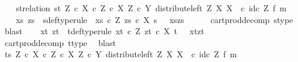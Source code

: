 \begin{isabellebody}
\ \ \isamarkupfalse%
\ st{\isacharunderscore}{\kern0pt}relation{\isacharcolon}{\kern0pt}\ {\isachardoublequoteopen}{\isasymlangle}s{\isacharcomma}{\kern0pt}t{\isasymrangle}\ {\isasymin}\isactrlbsub {\isacharparenleft}{\kern0pt}Z\ {\isasymtimes}\isactrlsub c\ X{\isacharparenright}{\kern0pt}\ {\isasymtimes}\isactrlsub c\ Z\ {\isasymtimes}\isactrlsub c\ X\isactrlesub \ {\isacharparenleft}{\kern0pt}Z\ {\isasymtimes}\isactrlsub c\ Y{\isacharcomma}{\kern0pt}\ distribute{\isacharunderscore}{\kern0pt}left\ Z\ X\ X\ \ {\isasymcirc}\isactrlsub c\ {\isacharparenleft}{\kern0pt}id\isactrlsub c\ Z\ {\isasymtimes}\isactrlsub f\ m{\isacharparenright}{\kern0pt}{\isacharparenright}{\kern0pt}{\isachardoublequoteclose}\isanewline
\ \ \isanewline
\ \ \isamarkupfalse%
\ xs\ zs\ \ s{\isacharunderscore}{\kern0pt}def{\isacharbrackleft}{\kern0pt}type{\isacharunderscore}{\kern0pt}rule{\isacharbrackright}{\kern0pt}{\isacharcolon}{\kern0pt}\ {\isachardoublequoteopen}\ xs\ {\isasymin}\isactrlsub c\ Z{\isachardoublequoteclose}\ {\isachardoublequoteopen}zs\ {\isasymin}\isactrlsub c\ X{\isachardoublequoteclose}\ {\isachardoublequoteopen}s\ {\isacharequal}{\kern0pt}\ \ {\isasymlangle}xs{\isacharcomma}{\kern0pt}zs{\isasymrangle}{\isachardoublequoteclose}\isanewline
\ \ \ \ \isamarkupfalse%
\ cart{\isacharunderscore}{\kern0pt}prod{\isacharunderscore}{\kern0pt}decomp\ s{\isacharunderscore}{\kern0pt}type\ \isamarkupfalse%
\ blast\isanewline
\ \ \isamarkupfalse%
\ xt\ zt\ \ t{\isacharunderscore}{\kern0pt}def{\isacharbrackleft}{\kern0pt}type{\isacharunderscore}{\kern0pt}rule{\isacharbrackright}{\kern0pt}{\isacharcolon}{\kern0pt}\ {\isachardoublequoteopen}xt\ {\isasymin}\isactrlsub c\ Z{\isachardoublequoteclose}\ {\isachardoublequoteopen}zt\ {\isasymin}\isactrlsub c\ X{\isachardoublequoteclose}\ {\isachardoublequoteopen}t\ {\isacharequal}{\kern0pt}\ \ {\isasymlangle}xt{\isacharcomma}{\kern0pt}zt{\isasymrangle}{\isachardoublequoteclose}\isanewline
\ \ \ \ \isamarkupfalse%
\ cart{\isacharunderscore}{\kern0pt}prod{\isacharunderscore}{\kern0pt}decomp\ t{\isacharunderscore}{\kern0pt}type\ \isamarkupfalse%
\ blast\ \isanewline
\isanewline
\ \ \isamarkupfalse%
\ {\isachardoublequoteopen}{\isasymlangle}t{\isacharcomma}{\kern0pt}s{\isasymrangle}\ {\isasymin}\isactrlbsub {\isacharparenleft}{\kern0pt}Z\ {\isasymtimes}\isactrlsub c\ X{\isacharparenright}{\kern0pt}\ {\isasymtimes}\isactrlsub c\ {\isacharparenleft}{\kern0pt}Z\ {\isasymtimes}\isactrlsub c\ X{\isacharparenright}{\kern0pt}\isactrlesub \ {\isacharparenleft}{\kern0pt}Z\ {\isasymtimes}\isactrlsub c\ Y{\isacharcomma}{\kern0pt}\ distribute{\isacharunderscore}{\kern0pt}left\ Z\ X\ X\ \ {\isasymcirc}\isactrlsub c\ {\isacharparenleft}{\kern0pt}id\isactrlsub c\ Z\ {\isasymtimes}\isactrlsub f\ m{\isacharparenright}{\kern0pt}{\isacharparenright}{\kern0pt}{\isachardoublequoteclose}\ \isanewline

\end{isabellebody}
